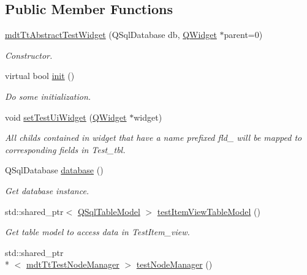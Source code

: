 \subsection*{Public Member Functions}
\begin{DoxyCompactItemize}
\item 
\hyperlink{classmdt_tt_abstract_test_widget_a020514c158e6f4cd69c90d6ad2639d84}{mdt\-Tt\-Abstract\-Test\-Widget} (Q\-Sql\-Database db, \hyperlink{class_q_widget}{Q\-Widget} $\ast$parent=0)
\begin{DoxyCompactList}\small\item\em Constructor. \end{DoxyCompactList}\item 
virtual bool \hyperlink{classmdt_tt_abstract_test_widget_a5349487687ae284444736abc8a8137d2}{init} ()
\begin{DoxyCompactList}\small\item\em Do some initialization. \end{DoxyCompactList}\item 
void \hyperlink{classmdt_tt_abstract_test_widget_a641e76e1158883f2fb6d4edba2bea831}{set\-Test\-Ui\-Widget} (\hyperlink{class_q_widget}{Q\-Widget} $\ast$widget)
\begin{DoxyCompactList}\small\item\em All childs contained in widget that have a name prefixed fld\-\_\- will be mapped to corresponding fields in Test\-\_\-tbl. \end{DoxyCompactList}\item 
Q\-Sql\-Database \hyperlink{classmdt_tt_abstract_test_widget_ac2ebb091978e48a1e26145ca9070b98e}{database} ()
\begin{DoxyCompactList}\small\item\em Get database instance. \end{DoxyCompactList}\item 
std\-::shared\-\_\-ptr$<$ \hyperlink{class_q_sql_table_model}{Q\-Sql\-Table\-Model} $>$ \hyperlink{classmdt_tt_abstract_test_widget_a4d9c92f372471c6251c4ecab31b2a230}{test\-Item\-View\-Table\-Model} ()
\begin{DoxyCompactList}\small\item\em Get table model to access data in Test\-Item\-\_\-view. \end{DoxyCompactList}\item 
std\-::shared\-\_\-ptr\\*
$<$ \hyperlink{classmdt_tt_test_node_manager}{mdt\-Tt\-Test\-Node\-Manager} $>$ \hyperlink{classmdt_tt_abstract_test_widget_aa3b498aac3e4f4fdcf5ce6b4f6d33c9f}{test\-Node\-Manager} ()

\end{DoxyCompactItemize}
